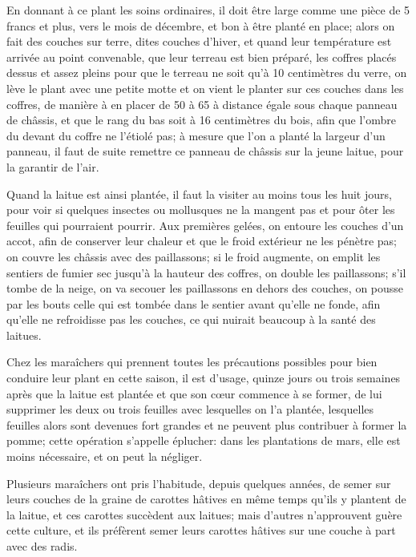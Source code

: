 \documentclass[10pt,a4paper]{book}
\begin{document}
En donnant à ce plant les soins ordinaires, il doit être large comme une pièce de 5 francs et plus, vers le mois de décembre, et bon à être planté en place; alors on fait des couches sur terre, dites couches d'hiver, et quand leur température est arrivée au point convenable, que leur terreau est bien préparé, les coffres placés dessus et assez pleins pour que le terreau ne soit qu'à 10 centimètres du verre, on lève le plant avec une petite motte et on vient le planter sur ces couches dans les coffres, de manière à en placer de 50 à 65 à distance égale sous chaque panneau de châssis, et que le rang du bas soit à 16 centimètres du bois, afin que l'ombre du devant du coffre ne l'étiolé pas; à mesure que l'on a planté la largeur d'un panneau, il faut de suite remettre ce panneau de châssis sur la jeune laitue, pour la garantir de l'air.

Quand la laitue est ainsi plantée, il faut la visiter au moins tous les huit jours, pour voir si quelques insectes ou mollusques ne la mangent pas et pour ôter les feuilles qui pourraient pourrir. Aux premières gelées, on entoure les couches d'un accot, afin de conserver leur chaleur et que le froid extérieur ne les pénètre pas; on couvre les châssis avec des paillassons; si le froid augmente, on emplit les sentiers de fumier sec jusqu'à la hauteur des coffres, on double les paillassons; s'il tombe de la neige, on va secouer les paillassons en dehors des couches, on pousse par les bouts celle qui est tombée dans le sentier avant qu'elle ne fonde, afin qu'elle ne refroidisse pas les couches, ce qui nuirait beaucoup à la santé des laitues.

Chez les maraîchers qui prennent toutes les précautions possibles pour bien conduire leur plant en cette saison, il est d'usage, quinze jours ou trois semaines après que la laitue est plantée et que son cœur commence à se former, de lui supprimer les deux ou trois feuilles avec lesquelles on l'a plantée, lesquelles feuilles alors sont devenues fort grandes et ne peuvent plus contribuer à former la pomme; cette opération s'appelle éplucher: dans les plantations de mars, elle est moins nécessaire, et on peut la négliger.

Plusieurs maraîchers ont pris l'habitude, depuis quelques années, de semer sur leurs couches de la graine de carottes hâtives en même temps qu'ils y plantent de la laitue, et ces carottes succèdent aux laitues; mais d'autres n'approuvent guère cette culture, et ils préfèrent semer leurs carottes hâtives sur une couche à part avec des radis.
\end{document}

